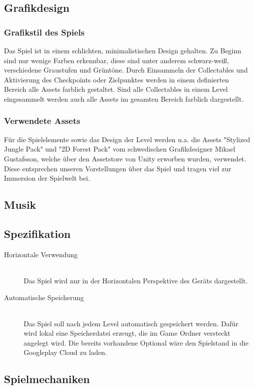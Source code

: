 \subsection{Grafikdesign}
\subsubsection{Grafikstil des Spiels}
Das Spiel ist in einem schlichten, minimalistischen Design gehalten. Zu Beginn sind nur wenige Farben erkennbar, diese sind unter anderem schwarz-weiß, verschiedene Graustufen und Grüntöne. Durch Einsammeln der Collectables und Aktivierung des Checkpoints oder Zielpunktes werden in einem definierten Bereich alle Assets farblich gestaltet. Sind alle Collectables in einem Level eingesammelt werden auch alle Assets im gesamten Bereich farblich dargestellt.

\subsubsection{Verwendete Assets}
Für die Spielelemente sowie das Design der Level werden u.a. die Assets "{}Stylized Jungle Pack"{}\cite{jungle} und {}"2D Forest Pack"{} \cite{forest} vom schwedischen Grafikdesigner Mikael Gustafsson, welche über den Assetstore von Unity erworben wurden, verwendet. Diese entsprechen unseren Vorstellungen über das Spiel und tragen viel zur Immersion der Spielwelt bei.

\subsection{Musik}
\subsection{Spezifikation}
\begin{description}
\item [Horizontale Verwendung] \hfill \\
Das Spiel wird nur in der Horizontalen Perspektive des Geräts dargestellt.

\item [Automatische Speicherung] \hfill \\
Das Spiel soll nach jedem Level automatisch gespeichert werden. Dafür wird lokal eine Speicherdatei erzeugt, die im Game Ordner versteckt angelegt wird. Die bereits vorhandene Optional wäre den Spielstand in die Googleplay Cloud zu laden.
\end{description}

\subsection{Spielmechaniken}

\newpage
